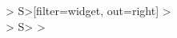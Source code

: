 \documentclass{article}
\begin{document}
 
\begin{beltgrid}
> S>[filter=widget, out=right] > \\
> S> >
\end{beltgrid}
\end{document}
